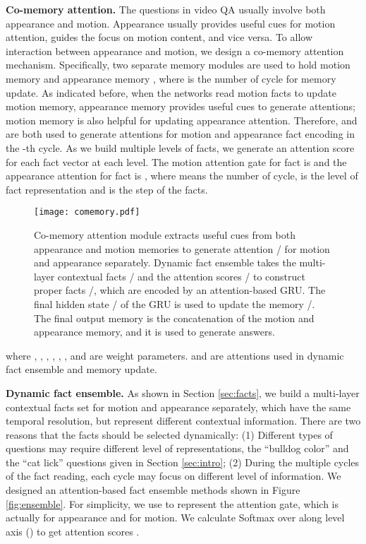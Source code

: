 \documentclass[10pt,twocolumn,letterpaper]{article}
\begin{document}
\textbf{Co-memory attention.} The questions in video QA usually involve both appearance and motion. 
Appearance usually provides useful cues for motion attention, \ie guides the focus on motion content, and vice versa. To allow interaction between appearance and motion,
we design a co-memory attention mechanism. Specifically, two separate memory modules are used to hold motion memory  and appearance memory , where  is the number of cycle for memory update. As indicated before, when the networks read motion facts to update motion memory, appearance memory provides useful cues to generate attentions; motion memory is also helpful for updating appearance attention. Therefore,  and  are both used to generate attentions for motion and appearance fact encoding in the -th cycle. As we build multiple levels of facts, we generate an attention score for each fact vector at each level. The motion attention gate for fact   is  and the appearance attention for fact   is , where  means the number of cycle,  is the level of fact representation and  is the step of the facts.
\begin{figure}[]
  \centering
    \texttt{[image: comemory.pdf]}
    \caption{Co-memory attention module extracts useful cues from both appearance and motion memories to generate attention / for motion and appearance separately. Dynamic fact ensemble takes the multi-layer contextual facts / and the attention scores / to construct proper facts /, which are encoded by an attention-based GRU. The final hidden state / of the GRU is used to update the memory /. The final output memory  is the concatenation of the motion and appearance memory, and it is used to generate answers. }
      \label{fig:comemory}
\end{figure}
 
 
where , , , , , ,  and  are weight parameters.  and  are attentions used in dynamic fact ensemble and memory update.


\textbf{Dynamic fact ensemble.}
As shown in Section \ref{sec:facts}, we build a multi-layer contextual facts set  for motion and appearance separately, which have the same temporal resolution, but represent different contextual information. There are two reasons that the facts should be selected dynamically: (1) Different types of questions may require different level of representations, \eg the ``bulldog color'' and the ``cat lick'' questions given in Section \ref{sec:intro}; (2) During the multiple cycles of the fact reading, each cycle may focus on different level of information. We designed an attention-based fact ensemble methods shown in Figure \ref{fig:ensemble}. For simplicity, we use  to represent the attention gate, which is actually  for appearance and  for motion. We calculate Softmax over  along level axis (\ie )  to get attention scores . 
\end{document}
